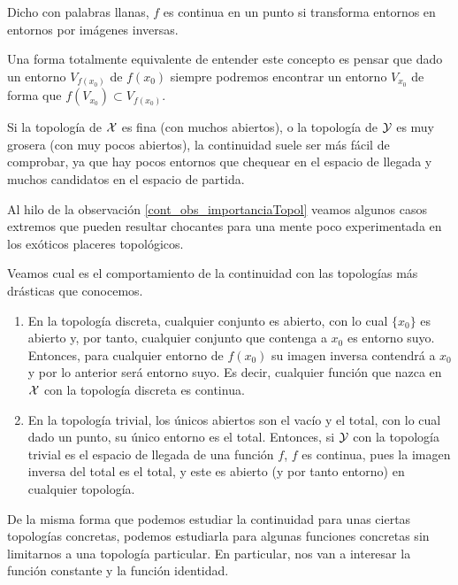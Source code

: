 Dicho con palabras llanas, $f$ es continua en un punto si transforma entornos en entornos por imágenes inversas.

Una forma totalmente equivalente de entender este concepto es pensar que dado un entorno $V_{f(x_0)}$ de $f(x_0)$ siempre podremos encontrar un entorno $V_{x_0}$ de forma que $f(V_{x_0})\subset V_{f(x_0)}$.
\begin{obs}
	\label{cont_obs_importanciaTopol}
	Si la topología de $\mathcal{X}$ es fina (con muchos abiertos), o la topología de $\mathcal{Y}$ es muy grosera (con muy pocos abiertos), la continuidad suele ser más fácil de comprobar, ya que hay pocos entornos que chequear en el espacio de llegada y muchos candidatos en el espacio de partida.
\end{obs}
Al hilo de la observación \ref{cont_obs_importanciaTopol} veamos algunos casos extremos que pueden resultar chocantes para una mente poco experimentada en los exóticos placeres topológicos.
\begin{obs}
	\label{cont_obs_continuidad_discreta_trivial}
	Veamos cual es el comportamiento de la continuidad con las topologías más drásticas que conocemos.	
	\begin{enumerate}
		\item En la topología discreta, cualquier conjunto es abierto, con lo cual $\{x_0\}$ es abierto y, por tanto, cualquier conjunto que contenga a $x_0$ es entorno suyo. Entonces, para cualquier entorno de $f(x_0)$ su imagen inversa contendrá a $x_0$ y por lo anterior será entorno suyo. Es decir, cualquier función que nazca en $\mathcal{X}$ con la topología discreta es continua.
		
		\item En la topología trivial, los únicos abiertos son el vacío y el total, con lo cual dado un punto, su único entorno es el total. Entonces, si $\mathcal{Y}$ con la topología trivial es el espacio de llegada de una función $f$, $f$ es continua, pues la imagen inversa del total es el total, y este es abierto (y por tanto entorno) en cualquier topología. \qedhere 
	\end{enumerate}
\end{obs}

De la misma forma que podemos estudiar la continuidad para unas ciertas topologías concretas, podemos estudiarla para algunas funciones concretas sin limitarnos a una topología particular. En particular, nos van a interesar la función constante y la función identidad.

